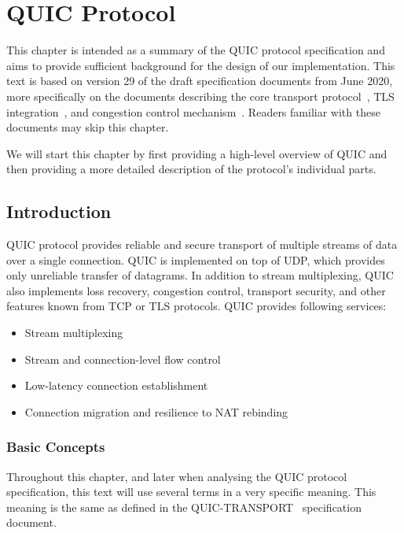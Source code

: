 \chapter{QUIC Protocol}\label{chap:02-quic}

This chapter is intended as a summary of the QUIC protocol specification and aims to provide
sufficient background for the design of our implementation. This text is based on version 29 of the
draft specification documents from June 2020, more specifically on the documents describing the core
transport protocol~\cite{draft-ietf-quic-transport}, TLS integration~\cite{draft-ietf-quic-tls}, and
congestion control mechanism~\cite{draft-ietf-quic-recovery}. Readers familiar with these documents
may skip this chapter.

We will start this chapter by first providing a high-level overview of QUIC and then providing a
more detailed description of the protocol's individual parts.

\section{Introduction}

QUIC protocol provides reliable and secure transport of multiple streams of data over a single
connection. QUIC is implemented on top of UDP, which provides only unreliable transfer of datagrams.
In addition to stream multiplexing, QUIC also implements loss recovery, congestion control,
transport security, and other features known from TCP or TLS protocols. QUIC provides following
services:

\begin{itemize}

  \item Stream multiplexing

  \item Stream and connection-level flow control

  \item Low-latency connection establishment

  \item Connection migration and resilience to NAT rebinding

\end{itemize}

\subsection{Basic Concepts}

Throughout this chapter, and later when analysing the QUIC protocol specification, this text will
use several terms in a very specific meaning. This meaning is the same as defined in the
QUIC-TRANSPORT~\cite{draft-ietf-quic-transport} specification document.

